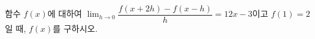 함수 $f(x)$에 대하여 $\displaystyle\lim_{h\to 0}\dfrac{f(x+2h)-f(x-h)}{h}=12x-3$이고 $f(1)=2$일 때, $f(x)$를 구하시오.
